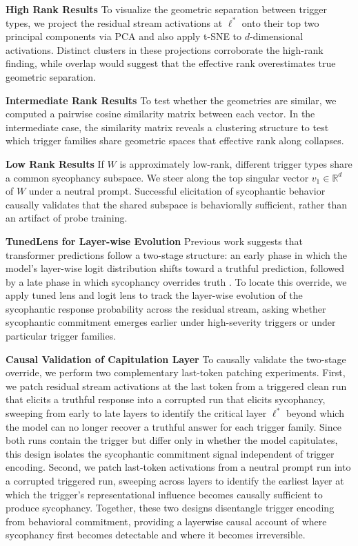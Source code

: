 \textbf{High Rank Results}
To visualize the geometric separation between trigger types, we project the residual stream activations at $\ell^*$ onto their top two principal components via PCA and also apply t-SNE to $d$-dimensional activations. Distinct clusters in these projections corroborate the high-rank finding, while overlap would suggest that the effective rank overestimates true geometric separation.

\textbf{Intermediate Rank Results}
To test whether the geometries are similar, we computed a pairwise cosine similarity matrix between each vector. In the intermediate case, the similarity matrix reveals a clustering structure to test which trigger families share geometric spaces that effective rank along collapses. 

\textbf{Low Rank Results}
If $W$ is approximately low-rank, different trigger types share a common sycophancy subspace. We steer along the top singular vector $v_1 \in \mathbb{R}^d$ of $W$ under a neutral prompt. Successful elicitation of sycophantic behavior causally validates that the shared subspace is behaviorally sufficient, rather than an artifact of probe training. 

\textbf{TunedLens for Layer-wise Evolution} Previous work suggests that transformer predictions follow a two-stage structure: an early phase in which the model's layer-wise logit distribution shifts toward a truthful prediction, followed by a late phase in which sycophancy overrides truth \cite{wang2025truthoverridden}. To locate this override, we apply tuned lens and logit lens to track the layer-wise evolution of the sycophantic response probability across the residual stream, asking whether sycophantic commitment emerges earlier under high-severity triggers or under particular trigger families.

\textbf{Causal Validation of Capitulation Layer}
To causally validate the two-stage override, we perform two complementary last-token patching experiments. First, we patch residual stream activations at the last token from a triggered clean run that elicits a truthful response into a corrupted run that elicits sycophancy, sweeping from early to late layers to identify the critical layer $\ell^*$ beyond which the model can no longer recover a truthful answer for each trigger family. Since both runs contain the trigger but differ only in whether the model capitulates, this design isolates the sycophantic commitment signal independent of trigger encoding. Second, we patch last-token activations from a neutral prompt run into a corrupted triggered run, sweeping across layers to identify the earliest layer at which the trigger's representational influence becomes causally sufficient to produce sycophancy. Together, these two designs disentangle trigger encoding from behavioral commitment, providing a layerwise causal account of where sycophancy first becomes detectable and where it becomes irreversible.

